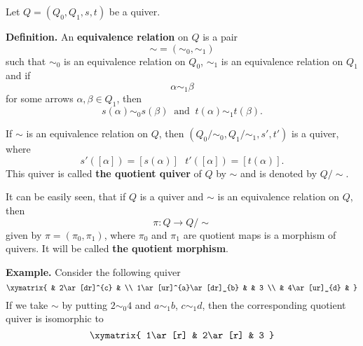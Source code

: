 \documentclass[12pt]{article}
\begin{document}
Let $Q=(Q_0,Q_1,s,t)$ be a quiver.

\textbf{Definition.} An \textbf{equivalence relation} on $Q$ is a pair
$$\sim=(\sim_0,\sim_1)$$
such that $\sim_0$ is an equivalence relation on $Q_0$, $\sim_1$ is an equivalence relation on $Q_1$ and if
$$\alpha\sim_1 \beta$$
for some arrows $\alpha,\beta\in Q_1$, then
$$s(\alpha)\sim_0 s(\beta)\ \mbox{ and }\ t(\alpha)\sim_1 t(\beta).$$

If $\sim$ is an equivalence relation on $Q$, then $(Q_0/\sim_0,Q_1/\sim_1,s',t')$ is a quiver, where
$$s'([\alpha])=[s(\alpha)]\ \ \ t'([\alpha])=[t(\alpha)].$$
This quiver is called \textbf{the quotient quiver} of $Q$ by $\sim$ and is denoted by $Q/\sim$.

It can be easily seen, that if $Q$ is a quiver and $\sim$ is an equivalence relation on $Q$, then
$$\pi:Q\to Q/\sim$$
given by $\pi=(\pi_0,\pi_1)$, where $\pi_0$ and $\pi_1$ are quotient maps is a morphism of quivers. It will be called \textbf{the quotient morphism}.

\textbf{Example.} Consider the following quiver
$$\xymatrix{
& 2\ar[dr]^{c} & \\
1\ar[ur]^{a}\ar[dr]_{b} & & 3 \\
 & 4\ar[ur]_{d} &
}$$
 If we take $\sim$ by putting $2\sim_0 4$ and $a\sim_1 b$, $c\sim_1 d$, then the corresponding quotient quiver is isomorphic to
$$\xymatrix{
1\ar[r] & 2\ar[r] & 3
}$$
 
\end{document}
